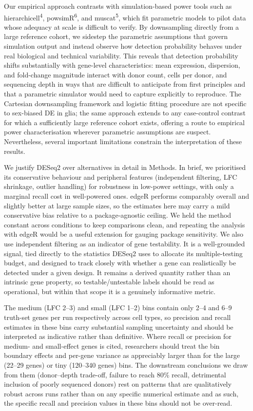 \documentclass[
]{article}
\begin{document}
Our empirical approach contrasts with simulation-based power tools such
as hierarchicell\textsuperscript{4}, powsimR\textsuperscript{6}, and
muscat\textsuperscript{5}, which fit parametric models to pilot data
whose adequacy at scale is difficult to verify. By downsampling directly
from a large reference cohort, we sidestep the parametric assumptions
that govern simulation output and instead observe how detection
probability behaves under real biological and technical variability.
This reveals that detection probability shifts substantially with
gene-level characteristics: mean expression, dispersion, and fold-change
magnitude interact with donor count, cells per donor, and sequencing
depth in ways that are difficult to anticipate from first principles and
that a parametric simulator would need to capture explicitly to
reproduce. The Cartesian downsampling framework and logistic fitting
procedure are not specific to sex-biased DE in glia; the same approach
extends to any case-control contrast for which a sufficiently large
reference cohort exists, offering a route to empirical power
characterisation wherever parametric assumptions are suspect.
Nevertheless, several important limitations constrain the interpretation
of these results.

We justify DESeq2 over alternatives in detail in Methods. In brief, we
prioritised its conservative behaviour and peripheral features
(independent filtering, LFC shrinkage, outlier handling) for robustness
in low-power settings, with only a marginal recall cost in well-powered
ones. edgeR performs comparably overall and slightly better at large
sample sizes, so the estimates here may carry a mild conservative bias
relative to a package-agnostic ceiling. We held the method constant
across conditions to keep comparisons clean, and repeating the analysis
with edgeR would be a useful extension for gauging package sensitivity.
We also use independent filtering as an indicator of gene testability.
It is a well-grounded signal, tied directly to the statistics DESeq2
uses to allocate its multiple-testing budget, and designed to track
closely with whether a gene can realistically be detected under a given
design. It remains a derived quantity rather than an intrinsic gene
property, so testable/untestable labels should be read as operational,
but within that scope it is a genuinely informative metric.

The medium (\textbar LFC\textbar{} 2--3) and small
(\textbar LFC\textbar{} 1--2) bins contain only 2--4 and 6--9 truth-set
genes per run respectively across cell types, so precision and recall
estimates in these bins carry substantial sampling uncertainty and
should be interpreted as indicative rather than definitive. Where recall
or precision for medium- and small-effect genes is cited, researchers
should treat the bin boundary effects and per-gene variance as
appreciably larger than for the large (22--29 genes) or tiny (120--340
genes) bins. The downstream conclusions we draw from them (donor--depth
trade-off, failure to reach 80\% recall, detrimental inclusion of poorly
sequenced donors) rest on patterns that are qualitatively robust across
runs rather than on any specific numerical estimate and as such, the
specific recall and precision values in these bins should not be
over-read.
\end{document}
